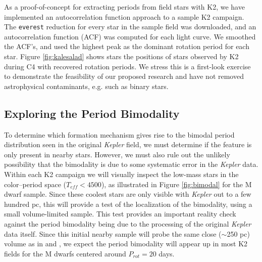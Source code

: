 \documentclass[12pt]{article}
\newcommand{\Kepler}{\textsl{Kepler}\xspace}
\begin{document}
As a proof-of-concept for extracting periods from field stars with K2, we have implemented an autocorrelation function approach to a sample K2 campaign. The {\tt everest} \citep{luger2016} reduction for every star in the sample field was downloaded, and an autocorrelation function (ACF) was computed for each light curve. We smoothed the ACF's, and used the highest peak as the dominant rotation period for each star.
Figure \ref{fig:kalesalad} shows stars the positions of stars observed by K2 during C4 with recovered rotation periods. We stress this is a first-look exercise to demonstrate the feasibility of our proposed research and have not removed astrophysical contaminants, e.g. such as binary stars. 






\subsection{Exploring the Period Bimodality}


To determine which formation mechanism gives rise to the bimodal period distribution seen in the original \Kepler field, we must determine if the feature is only present in nearby stars. However, we must also rule out the unlikely possibility that the bimodality is due to some systematic error in the \Kepler data. Within each K2 campaign we will visually inspect the low-mass stars in the color--period space ($T_{eff}<4500$), as illustrated in Figure \ref{fig:bimodal} for the \citet{mcquillan2013} M dwarf sample. Since these coolest stars are only visible with \Kepler out to a few hundred pc, this will provide a test of the localization of the bimodality, using a small volume-limited sample. This test provides an important reality check against the period bimodality being due to the processing of the original \Kepler data itself. Since this initial nearby sample will probe the same close ($\sim$250 pc) volume as in \citet{mcquillan2013} and \citet{davenport2017}, we expect the period bimodality will appear up in most K2 fields for the M dwarfs centered around $P_{rot}=20$ days.
\end{document}
